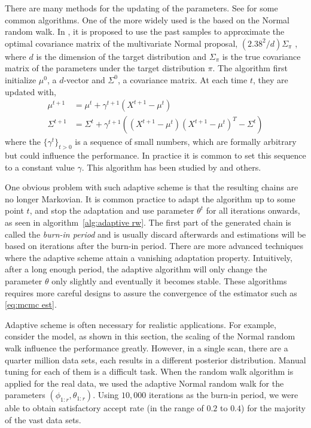 There are many methods for the updating of the parameters. See
\cite{Andrieu:2008kh} for some common algorithms. One of the more widely used
is the based on the Normal random walk. In \cite{Haario:1999dh,Haario:2001gu},
it is proposed to use the past samples to approximate the optimal covariance
matrix of the multivariate Normal proposal, $(2.38^2/d)\Sigma_{\pi}$
\cite{Gelman1995vx}, where $d$ is the dimension of the target distribution and
$\Sigma_{\pi}$ is the true covariance matrix of the parameters under the
target distribution $\pi$. The algorithm first initialize $\mu^0$, a
$d$-vector and $\Sigma^0$, a covariance matrix. At each time $t$, they are
updated with,
\begin{align}
  \mu^{t+1} &= \mu^t + \gamma^{t+1} (X^{t+1} - \mu^t) \\
  \Sigma^{t+1} &= \Sigma^t + \gamma^{t+1}((X^{t+1} - \mu^t)(X^{t+1} - \mu^t)^T
  - \Sigma^t)
\end{align}
where the $\{\gamma^t\}_{t>0}$ is a sequence of small numbers, which are
formally arbitrary but could influence the performance. In practice it is
common to set this sequence to a constant value $\gamma$. This algorithm has
been studied by \cite{Andrieu:2006tw} and others.

One obvious problem with such adaptive scheme is that the resulting chains are
no longer Markovian. It is common practice to adapt the algorithm up to some
point $t$, and stop the adaptation and use parameter $\theta^t$ for all
iterations onwards, as seen in algorithm~\ref{alg:adaptive rw}. The first part
of the generated chain is called the \emph{burn-in period} and is usually
discard afterwards and estimations will be based on iterations after the
burn-in period. There are more advanced techniques where the adaptive scheme
attain a vanishing adaptation property. Intuitively, after a long enough
period, the adaptive algorithm will only change the parameter $\theta$ only
slightly and eventually it becomes stable. These algorithms requires more
careful designs to assure the convergence of the estimator such as
\eqref{eq:mcmc est}.

Adaptive scheme is often necessary for realistic applications. For example,
consider the \pet model, as shown in this section, the scaling of the Normal
random walk influence the performance greatly. However, in a single \pet scan,
there are a quarter million data sets, each results in a different posterior
distribution. Manual tuning for each of them is a difficult task. When the
random walk algorithm is applied for the real data, we used the adaptive
Normal random walk for the parameters $(\phi_{1:r},\theta_{1:r})$. Using
$10,000$ iterations as the burn-in period, we were able to obtain satisfactory
accept rate (in the range of $0.2$ to $0.4$) for the majority of the vast data
sets.


